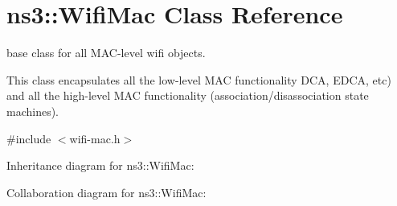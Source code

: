 \hypertarget{classns3_1_1WifiMac}{}\section{ns3\+:\+:Wifi\+Mac Class Reference}
\label{classns3_1_1WifiMac}


base class for all M\+A\+C-\/level wifi objects.

This class encapsulates all the low-\/level M\+AC functionality D\+CA, E\+D\+CA, etc) and all the high-\/level M\+AC functionality (association/disassociation state machines).  




{\ttfamily \#include $<$wifi-\/mac.\+h$>$}



Inheritance diagram for ns3\+:\+:Wifi\+Mac\+:


Collaboration diagram for ns3\+:\+:Wifi\+Mac\+:
